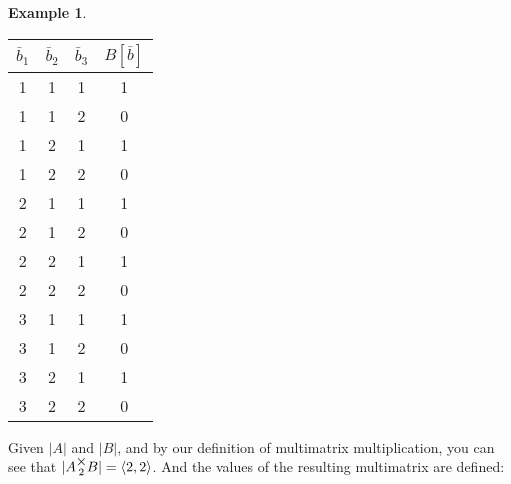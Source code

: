 \documentclass[12pt]{book}
\theoremstyle{plain}
\theoremstyle{definition}
\newtheorem{example}{Example}[chapter]
\theoremstyle{ppart}
\theoremstyle{case}
\theoremstyle{solution}
\newcommand{\mmult}[1]{\text{\raisebox{1ex}{$\underset{#1}{\times}$}}}
\begin{document}
\begin{example}
\begin{table}[h!]
\begin{center}
\begin{tabular}{c c c | c}
$\bar{b}_1$ & $\bar{b}_2$ & $\bar{b}_3$ & $B[\bar{b}]$ \\
\hline
1           & 1           & 1           & 1            \\
1           & 1           & 2           & 0            \\
1           & 2           & 1           & 1            \\
1           & 2           & 2           & 0            \\
2           & 1           & 1           & 1            \\
2           & 1           & 2           & 0            \\
2           & 2           & 1           & 1            \\
2           & 2           & 2           & 0            \\
3           & 1           & 1           & 1            \\
3           & 1           & 2           & 0            \\
3           & 2           & 1           & 1            \\
3           & 2           & 2           & 0
\end{tabular}
\end{center}
\end{table}

Given $|A|$ and $|B|$, and by our definition of multimatrix multiplication,
you can see that $|A \mmult{2} B| = \left<2, 2\right>$. And the values of the
resulting multimatrix are defined:


\end{example}
\end{document}
